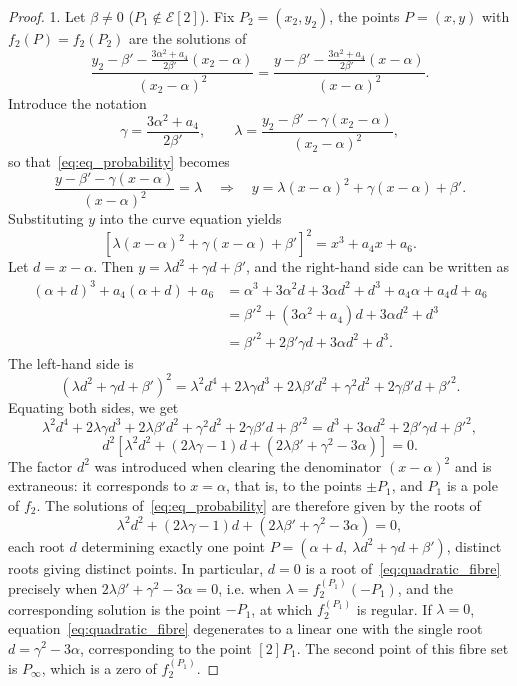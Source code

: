 \documentclass[sn-mathphys-num]{sn-jnl_modified}
\begin{document}
\begin{proof}
1. Let $\beta \neq 0$ ($P_1 \notin \mathcal{E}[2]$). Fix $P_2 = (x_2,y_2)$, the points $P = (x,y)$ with $f_2(P) = f_2(P_2)$ are the solutions of
\begin{equation}\label{eq:eq_probability}
\frac{y_2 - \beta' - \frac{3\alpha^2 + a_4}{2\beta'}(x_2 - \alpha)}{(x_2-\alpha)^2}
=
\frac{y - \beta' - \frac{3\alpha^2 + a_4}{2\beta'}(x - \alpha)}{(x-\alpha)^2}.
\end{equation}
Introduce the notation
\[
\gamma = \frac{3\alpha^2 + a_4}{2\beta'},
\qquad
\lambda = \frac{y_2 - \beta' - \gamma(x_2 - \alpha)}{(x_2 - \alpha)^2},
\]
so that~\eqref{eq:eq_probability} becomes
\[
\frac{y - \beta' - \gamma(x-\alpha)}{(x-\alpha)^2} = \lambda
\quad\Longrightarrow\quad
y = \lambda(x-\alpha)^2 + \gamma(x-\alpha) + \beta'.
\]
Substituting $y$ into the curve equation yields
\[
\left[\lambda(x-\alpha)^2 + \gamma(x-\alpha) + \beta'\right]^2 = x^3 + a_4x + a_6 .
\]
Let $d = x - \alpha$. Then $y = \lambda d^2 + \gamma d + \beta'$, and the right-hand side can be written as
\[
\begin{split}
(\alpha + d)^3 + a_4(\alpha + d) + a_6
&= \alpha^3 + 3\alpha^2 d + 3\alpha d^2 + d^3 + a_4\alpha + a_4 d + a_6\\
&= \beta'^2 + (3\alpha^2 + a_4)d + 3\alpha d^2 + d^3\\
&= \beta'^2 + 2\beta'\gamma d + 3\alpha d^2 + d^3 .
\end{split}
\]
The left-hand side is
\[
(\lambda d^2 + \gamma d + \beta')^2
= \lambda^2 d^4 + 2\lambda\gamma d^3 + 2\lambda\beta' d^2 + \gamma^2 d^2
+ 2\gamma\beta' d + \beta'^2 .
\]
Equating both sides, we get
\[
\lambda^2 d^4 + 2\lambda\gamma d^3 + 2\lambda\beta' d^2 + \gamma^2 d^2 + 2\gamma\beta' d
+ \beta'^2
= d^3 + 3\alpha d^2 + 2\beta'\gamma d + \beta'^2 ,
\]
\[
d^2\left[\lambda^2 d^2 + (2\lambda\gamma - 1)d + (2\lambda\beta' + \gamma^2 - 3\alpha)\right]
= 0 .
\]
The factor $d^2$ was introduced when clearing the denominator $(x-\alpha)^2$ and is extraneous: it corresponds to $x = \alpha$, that is, to the points $\pm P_1$, and $P_1$ is a pole of $f_2$. The solutions of~\eqref{eq:eq_probability} are therefore given by the roots of
\begin{equation}\label{eq:quadratic_fibre}
\lambda^2 d^2 + (2\lambda\gamma - 1)d + (2\lambda\beta' + \gamma^2 - 3\alpha) = 0 ,
\end{equation}
each root $d$ determining exactly one point $P = (\alpha + d,\ \lambda d^2 + \gamma d + \beta')$, distinct roots giving distinct points. In particular, $d = 0$ is a root of~\eqref{eq:quadratic_fibre} precisely when $2\lambda\beta' + \gamma^2 - 3\alpha = 0$, i.e. when $\lambda = f_2^{(P_1)}(-P_1)$, and the corresponding solution is the point $-P_1$, at which $f_2^{(P_1)}$ is regular. If $\lambda = 0$, equation~\eqref{eq:quadratic_fibre} degenerates to a linear one with the single root $d = \gamma^2 - 3\alpha$, corresponding to the point $[2]P_1$. The second point of this fibre set is $P_\infty$, which is a zero of $f_2^{(P_1)}$.


\end{proof}
\end{document}
